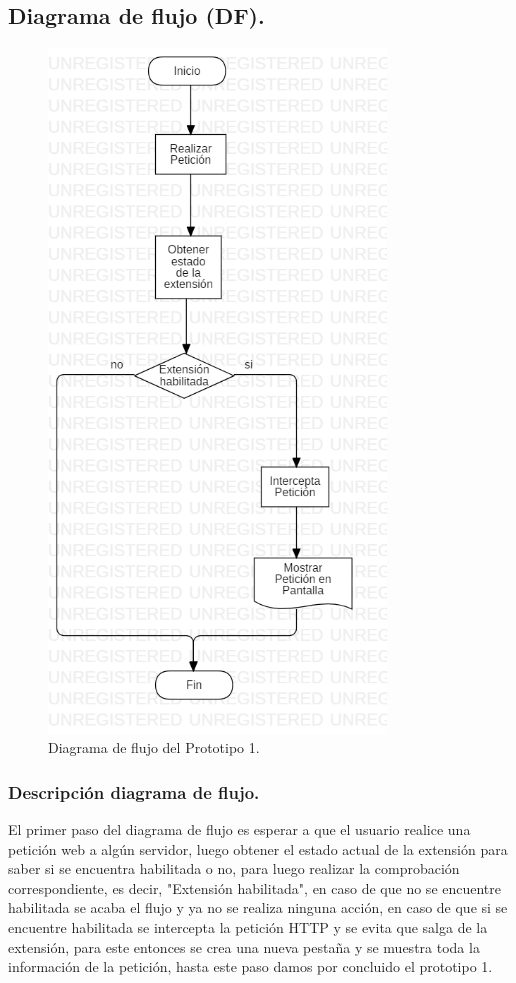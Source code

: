 \documentclass[12pt, a4paper, titlepage]{report}
\begin{document}
		    \subsection{Diagrama de flujo (DF).}
    			\begin{figure}[H]
    			    \begin{center} \includegraphics[width=0.8\textwidth]{imagenes/Desarrollo/Prototipo_1/DF_P1.png}
    			        \caption{Diagrama de flujo del Prototipo 1.}
    				\end{center}
    			\end{figure}
		        \subsubsection{Descripción diagrama de flujo.}
		        El primer paso del diagrama de flujo es esperar a que el usuario realice una petición web a algún servidor, luego obtener el estado actual de la extensión para saber si se encuentra habilitada o no, para luego realizar la comprobación correspondiente, es decir, "Extensión habilitada", en caso de que no se encuentre habilitada se acaba el flujo y ya no se realiza ninguna acción, en caso de que si se encuentre habilitada se intercepta la petici\'on HTTP y se evita que salga de la extensión, para este entonces se crea una nueva pestaña y se muestra toda la información de la petici\'on, hasta este paso damos por concluido el prototipo 1.
\end{document}
